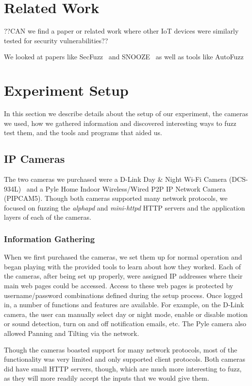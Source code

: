\documentclass[letterpaper,twocolumn,10pt]{article}
\begin{document}
\section{Related Work}
??CAN we find a paper or related work where other IoT devices were similarly tested for security vulnerabilities??


We looked at papers like SecFuzz~\cite{secfuzz} and SNOOZE~\cite{snooze} as well as tools like AutoFuzz~\cite{autofuzz}

\section{Experiment Setup}
In this section we describe details about the setup of our experiment, the
cameras we used, how we gathered information and discovered interesting ways to fuzz test them, and the tools and programs that aided us.  

\subsection{IP Cameras}
The two cameras we purchased were a D-Link Day \& Night Wi-Fi Camera (DCS-934L)~\cite{dlinkCam} and a Pyle Home Indoor Wireless/Wired P2P IP Network Camera (PIPCAM5). Though both cameras supported many network protocols, we focused on fuzzing the \textit{alphapd} and \textit{mini-httpd} HTTP servers and the application layers of each of the cameras. 


\subsubsection{Information Gathering}
When we first purchased the cameras, we set them up for normal operation and began playing with the provided tools to learn about how they worked. Each of the cameras, after being set up properly, were assigned IP addresses where their main web pages could be accessed. Access to these web pages is protected by username/password combinations defined during the setup process. Once logged in, a number of functions and features are available. For example, on the D-Link camera, the user can manually select day or night mode, enable or disable motion or sound detection, turn on and off notification emails, etc. The Pyle camera also allowed Panning and Tilting via the network.

Though the cameras boasted support for many network protocols, most of the functionality was very limited and only supported client protocols. Both cameras did have small HTTP servers, though, which are much more interesting to fuzz, as they will more readily accept the inputs that we would give them. 
\end{document}
